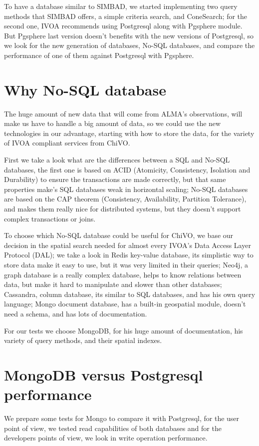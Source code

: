 \documentclass[11pt,twoside]{article}
\begin{document}
To have a database similar to SIMBAD, we started implementing two query methods that SIMBAD offers, a simple criteria search, 
and ConeSearch; for the second one, IVOA recommends using Postgresql along with Pgsphere module. But Pgsphere last version doesn't
benefits with the new versions of Postgresql, so we look for the new generation of databases, No-SQL databases, and compare the
performance of one of them against Postgresql with Pgsphere.


\section{Why No-SQL database}
    The huge amount of new data that will come from ALMA’s observations, will make us  have to handle a big amount of data, 
    so we could use the new technologies in our advantage, starting with how to store the data, for the variety of IVOA compliant
    services from ChiVO.
    
    First we take a look what are the differences between a SQL and No-SQL databases, the first one is based on ACID 
    (Atomicity, Consistency, Isolation and Durability) to ensure the transactions are made correctly, but that same properties
    make’s SQL databases weak in horizontal scaling; No-SQL databases are based on the CAP theorem (Consistency, Availability, 
    Partition Tolerance), and makes them really nice for distributed systems, but they doesn't support complex transactions or joins.

    To choose which No-SQL database could be useful for ChiVO, we base our decision in the spatial search needed for almost every
    IVOA’s Data Access Layer Protocol (DAL); we take a look in Redis key-value database, its simplistic way to store data make it 
    easy to use, but it was very limited in their queries; Neo4j, a graph database is a really complex database, helps to know 
    relations between data, but make it hard to manipulate and slower than other databases; Cassandra, column database, its similar
    to SQL databases, and has his own query language; Mongo document database, has a built-in geospatial module, doesn’t need a
    schema, and has lots of documentation.

    For our tests we choose MongoDB, for his huge amount of documentation, his variety of query methods, and their spatial indexes.


\section{MongoDB versus Postgresql performance}
    We prepare some tests for Mongo to compare it with Postgresql, for the user point of view, we tested read capabilities of both databases and
    for the developers points of view, we look in write operation performance.
    
\end{document}
